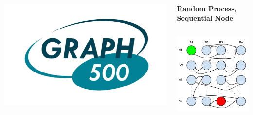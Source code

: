 \documentclass[final]{beamer} %
\begin{document}
\begin{frame}[t]
\begin{columns}[t]
\begin{column}{0.60\paperwidth}
\begin{columns}[t,totalwidth=0.60\paperwidth]
\begin{column}{0.28\paperwidth}
\begin{columns}[t,totalwidth=0.28\paperwidth]
\begin{column}{0.12\paperwidth}
								\begin{center} \includegraphics[width=0.12\paperwidth]{img/logo_graph500} \end{center}
							\end{column}
						\end{columns}
					\end{column}
					\begin{column}{0.28\paperwidth}
						\begin{center} \bf{Random Process, Sequential Node} \end{center}
						\begin{columns}[t,totalwidth=0.28\paperwidth]
							\begin{column}{0.12\paperwidth}
								\begin{center} \includegraphics[width=0.12\paperwidth]{img/linked_list/rand_proc_seq_node} \end{center}

\end{column}
\end{columns}
\end{column}
\end{columns}
\end{column}
\end{columns}
\end{frame}
\end{document}

